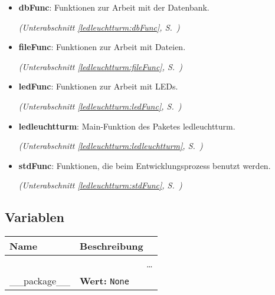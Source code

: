 \begin{itemize}
\setlength{\parskip}{0ex}
\item \textbf{dbFunc}: Funktionen zur Arbeit mit der Datenbank.



  \textit{(Unterabschnitt \ref{ledleuchtturm:dbFunc}, S.~\pageref{ledleuchtturm:dbFunc})}

\item \textbf{fileFunc}: Funktionen zur Arbeit mit Dateien.



  \textit{(Unterabschnitt \ref{ledleuchtturm:fileFunc}, S.~\pageref{ledleuchtturm:fileFunc})}

\item \textbf{ledFunc}: Funktionen zur Arbeit mit LEDs.



  \textit{(Unterabschnitt \ref{ledleuchtturm:ledFunc}, S.~\pageref{ledleuchtturm:ledFunc})}

\item \textbf{ledleuchtturm}: Main-Funktion des Paketes ledleuchtturm.



  \textit{(Unterabschnitt \ref{ledleuchtturm:ledleuchtturm}, S.~\pageref{ledleuchtturm:ledleuchtturm})}

\item \textbf{stdFunc}: Funktionen, die beim Entwicklungsprozess benutzt werden.



  \textit{(Unterabschnitt \ref{ledleuchtturm:stdFunc}, S.~\pageref{ledleuchtturm:stdFunc})}

\end{itemize}



  \subsection{Variablen}

    \vspace{-1cm}
\hspace{\varindent}\begin{longtable}{|p{\varnamewidth}|p{\vardescrwidth}|l}
\cline{1-2}
\cline{1-2} \centering \textbf{Name} & \centering \textbf{Beschreibung}& \\
\cline{1-2}
\endhead\cline{1-2}\multicolumn{3}{r}{\small\ldots}\\\endfoot\cline{1-2}
\endlastfoot\raggedright \_\-\_\-p\-a\-c\-k\-a\-g\-e\-\_\-\_\- & \raggedright \textbf{Wert:} 
{\tt None}&\\
\cline{1-2}
\end{longtable}

